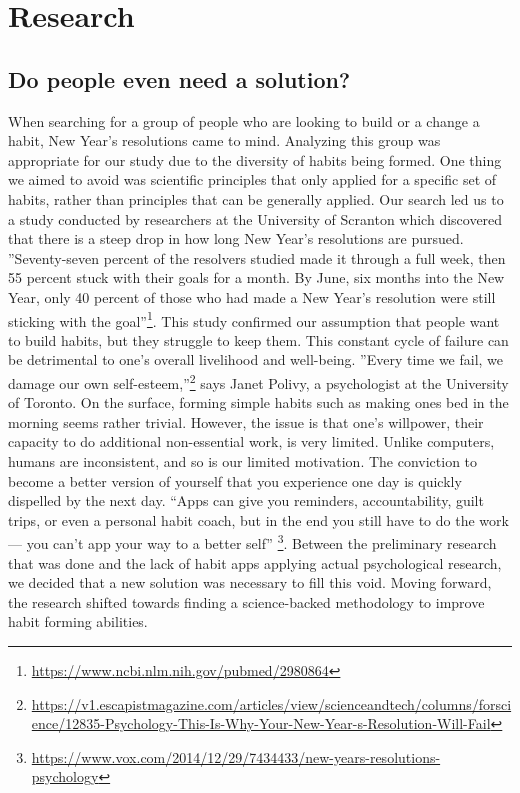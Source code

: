 \section{Research}
\subsection{Do people even need a solution?}
When searching for a group of people who are looking to build or a change a habit, New Year’s resolutions came to mind. Analyzing this group was appropriate for our study due to the diversity of habits being formed. One thing we aimed to avoid was scientific principles that only applied for a specific set of habits, rather than principles that can be generally applied. Our search led us to a study conducted by researchers at the University of Scranton which discovered that there is a steep drop in how long New Year’s resolutions are pursued. ”Seventy-seven percent of the resolvers studied made it through a full week, then 55 percent stuck with their goals for a month. By June, six months into the New Year, only 40 percent of those who had made a New Year’s resolution were still sticking with the goal”\footnote{\url{https://www.ncbi.nlm.nih.gov/pubmed/2980864}}. This study confirmed our assumption that people want to build habits, but they struggle to keep them. This constant cycle of failure can be detrimental to one’s overall livelihood and well-being. ”Every time we fail, we damage our own self-esteem,”\footnote{\url{https://v1.escapistmagazine.com/articles/view/scienceandtech/columns/forscience/12835-Psychology-This-Is-Why-Your-New-Year-s-Resolution-Will-Fail}} says Janet Polivy, a psychologist at the University of Toronto.
\newline \newline
On the surface, forming simple habits such as making ones bed in the morning seems rather trivial. However, the issue is that one’s willpower, their capacity to do additional non-essential work, is very limited. Unlike computers, humans are inconsistent, and so is our limited motivation. The conviction to become a better version of yourself that you experience one day is quickly dispelled by the next day. “Apps can give you reminders, accountability, guilt trips, or even a personal habit coach, but in the end you still have to do the work — you can’t app your way to a better self”  \footnote{\url{https://www.vox.com/2014/12/29/7434433/new-years-resolutions-psychology}}.
Between the preliminary research that was done and the lack of habit apps applying actual psychological research, we decided that a new solution was necessary to fill this void. Moving forward, the research shifted towards finding a science-backed methodology to improve habit forming abilities.

